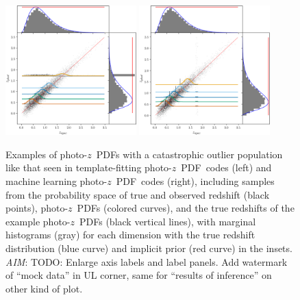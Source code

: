 \documentclass[iop]{emulateapj}
\newcommand{\todo}[3]{{\color{#2}\emph{#1}: #3}}
\newcommand{\aim}[1]{\todo{AIM}{red}{#1}}
\newcommand{\pz}{photo-$z$}
\newcommand{\pzpdf}{\pz\ PDF}%
\begin{document}
\begin{figure}
	\begin{center}
	\includegraphics[width=0.45\textwidth]{figures/chippr/thesis_eout_mega_scatter.png}
	\includegraphics[width=0.45\textwidth]{figures/chippr/thesis_rout_mega_scatter.png}
	\caption{
		Examples of \pzpdf s with a catastrophic outlier population like that seen in template-fitting \pzpdf\ codes (left) and machine learning \pzpdf\ codes (right), including samples from the probability space of true and observed redshift (black points), \pzpdf s (colored curves), and the true redshifts of the example \pzpdf s (black vertical lines), with marginal histograms (gray) for each dimension with the true redshift distribution (blue curve) and implicit prior (red curve) in the insets.
		\aim{TODO: Enlarge axis labels and label panels.
		Add watermark of ``mock data'' in UL corner, same for ``results of inference'' on other kind of plot.}		
	}
	\label{fig:nonuniform-outliers-data}
	\end{center}
\end{figure}
\end{document}
